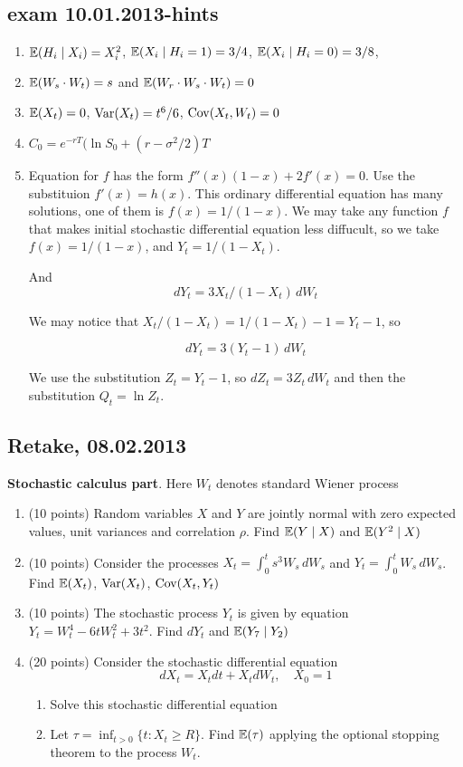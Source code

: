 \documentclass[pdftex,12pt,a4paper]{article}
\begin{document}
\subsection{exam 10.01.2013-hints}
\begin{enumerate}
\item $\mathbb{E}(H_i \mid X_i)=X_i^2$, $\mathbb{E}(X_i \mid H_i=1)=3/4$, $\mathbb{E}(X_i \mid H_i=0)=3/8$, 
\item $\mathbb{E}(W_s \cdot W_t)=s$ and $\mathbb{E}(W_r \cdot W_s \cdot W_t)=0$
\item $\mathbb{E}(X_t)=0$, $\operatorname{Var}(X_t)=t^6/6$, $\operatorname{Cov}(X_t,W_t)=0$
\item $C_0=e^{-rT}(\ln S_0+(r-\sigma^2/2)T$
\item Equation for $f$ has the form $f''(x)(1-x)+2f'(x)=0$. Use the substituion $f'(x)=h(x)$. This ordinary differential equation has many solutions, one of them is $f(x)=1/(1-x)$.   We may take any function $f$ that makes initial stochastic differential equation less diffucult, so we take $f(x)=1/(1-x)$, and  $Y_t=1/(1-X_t)$.

And 
\[
dY_t = 3X_t / (1-X_t) \, dW_t
\]

We may notice that $X_t/(1-X_t)=1/(1-X_t)-1=Y_t-1$, so

\[
dY_t= 3(Y_t-1) \, dW_t
\]

We use the substitution $Z_t=Y_t-1$, so $dZ_t=3Z_t \, dW_t$ and then the substitution $Q_t = \ln Z_t$.


\end{enumerate}




\subsection{Retake, 08.02.2013}

\textbf{Stochastic calculus part}. Here $W_t$ denotes standard Wiener process 

\vspace{20pt}

\begin{enumerate}
\item (10 points) Random variables $X$ and $Y$ are jointly normal with zero expected values, unit variances and correlation $\rho$. Find $\mathbb{E}(Y \mid X)$ and $\mathbb{E}(Y^2 \mid X)$
\item (10 points) Consider the processes $X_t=\int_0^t s^3 W_s\,dW_s$ and $Y_t=\int_0^t W_s \, dW_s$. Find $\mathbb{E}(X_t)$, $\operatorname{Var}(X_t)$, $\operatorname{Cov}(X_t,Y_t)$
\item (10 points) The stochastic process $Y_t$ is given by equation $Y_t=W_t^4-6tW_t^2+3t^2$. Find $dY_t$ and $\mathbb{E}(Y_7 \mid Y_2)$
\item (20 points) Consider the stochastic differential equation
\[
dX_t=X_t dt + X_t dW_t, \quad X_0=1
\]
\begin{enumerate}
\item Solve this stochastic differential equation
\item Let $\tau=\inf_{t>0} \{t:X_t\ge R\}$. Find $\mathbb{E}(\tau)$ applying the optional stopping theorem to the process $W_t$.
\end{enumerate}

\end{enumerate}
\end{document}
